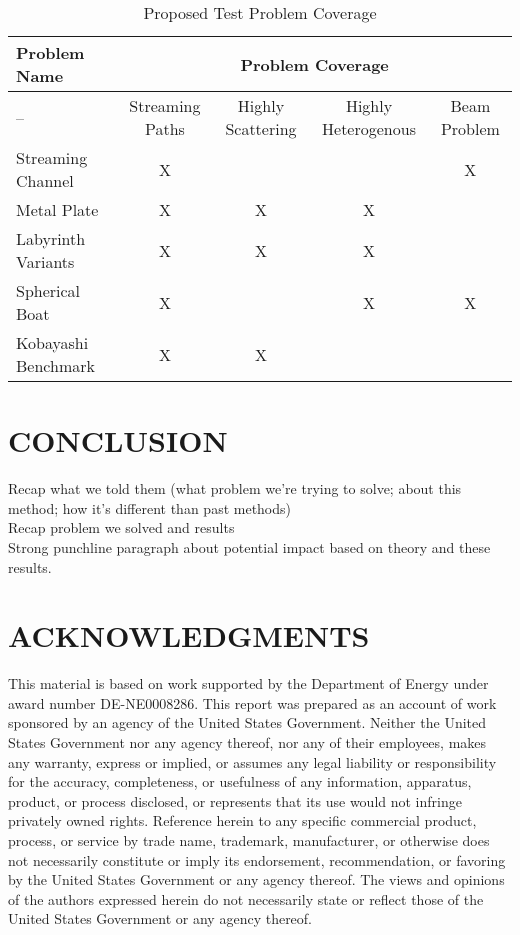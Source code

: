 \documentclass[12pt]{article}
\begin{document}
 \begin{table}
  \centering
  \caption{Proposed Test Problem Coverage}
  \begin{tabular}{l|cccc}
    \toprule
    Problem Name & \multicolumn{4}{c}{Problem Coverage} \\
    \hline
    -- & Streaming Paths & Highly Scattering & Highly Heterogenous & Beam Problem \\
    \hline
    Streaming Channel   & X & & & X \\ 
    Metal Plate         & X & X & X &  \\
    Labyrinth Variants  & X & X & X &  \\ 
    Spherical Boat      & X & & X & X \\  
    Kobayashi Benchmark & X & X &  &  \\   
	\bottomrule
  \end{tabular}
  \label{tab:testprobs}
\end{table}



%
\section{CONCLUSION} 
\label{sect::conclusion}

Recap what we told them (what problem we're trying to solve; about this method; how it's different than past methods)\\
Recap problem we solved and results\\
Strong punchline paragraph about potential impact based on theory and these results.

%
\section*{ACKNOWLEDGMENTS}

This material is based on work supported by the Department of Energy under award number DE-NE0008286. This report was prepared as an account of work sponsored by an agency of the United States Government. Neither the United States Government nor any agency thereof, nor any of their employees, makes any warranty, express or implied, or assumes any legal liability or responsibility for the accuracy, completeness, or usefulness of any information, apparatus, product, or process disclosed, or represents that its use would not infringe privately owned rights. Reference herein to any specific commercial product, process, or service by trade name, trademark, manufacturer, or otherwise does not necessarily constitute or imply its endorsement, recommendation, or favoring by the United States Government or any agency thereof. The views and opinions of the authors expressed herein do not necessarily state or reflect those of the United States Government or any agency thereof.
\end{document}
